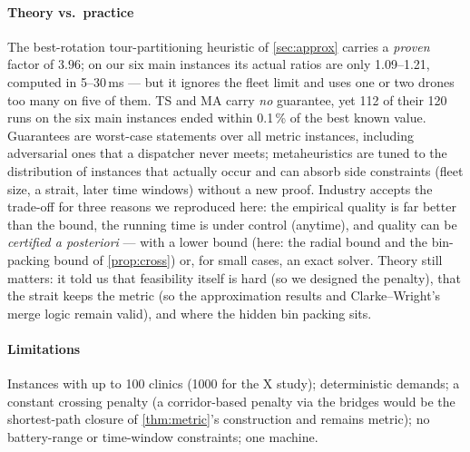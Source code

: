 \paragraph{Theory vs.\ practice} The best-rotation tour-partitioning heuristic of \cref{sec:approx} carries a
\emph{proven} factor of $3.96$; on our six main instances its actual ratios are only 1.09--1.21, computed in
5--30\,ms --- but it ignores the fleet limit and uses one or two drones too many on five of them. TS and MA carry
\emph{no} guarantee, yet 112 of their 120 runs on the six main instances ended within 0.1\,\% of the best known value. Guarantees are
worst-case statements over all metric instances, including adversarial ones that a dispatcher never meets;
metaheuristics are tuned to the distribution of instances that actually occur and can absorb side constraints
(fleet size, a strait, later time windows) without a new proof. Industry accepts the trade-off for three reasons we
reproduced here: the empirical quality is far better than the bound, the running time is under control (anytime), and
quality can be \emph{certified a posteriori} --- with a lower bound (here: the radial bound and the bin-packing bound
of \cref{prop:cross}) or, for small cases, an exact solver. Theory still matters: it told us that feasibility itself is
hard (so we designed the penalty), that the strait keeps the metric (so the approximation results and
Clarke--Wright's merge logic remain valid), and where the hidden bin packing sits.

\paragraph{Limitations} Instances with up to 100 clinics (1000 for the X study); deterministic demands; a constant
crossing penalty (a corridor-based penalty via the bridges would be the shortest-path closure of \cref{thm:metric}'s
construction and remains metric); no battery-range or time-window constraints; one machine.

